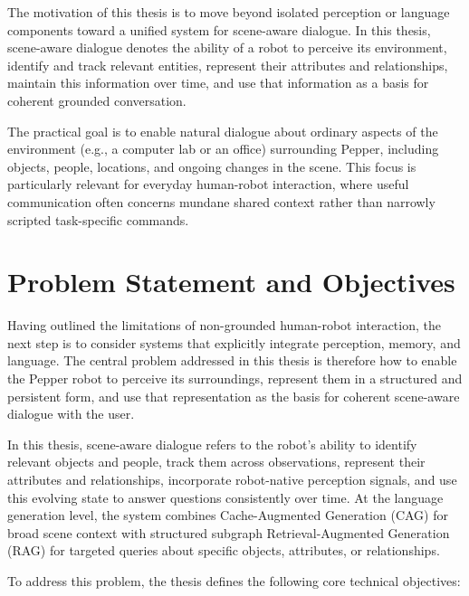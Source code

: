 The motivation of this thesis is to move beyond isolated perception or language components toward a unified system for scene-aware dialogue. In this thesis, scene-aware dialogue denotes the ability of a robot to perceive its environment, identify and track relevant entities, represent their attributes and relationships, maintain this information over time, and use that information as a basis for coherent grounded conversation.

The practical goal is to enable natural dialogue about ordinary aspects of the environment (e.g., a computer lab or an office) surrounding Pepper, including objects, people, locations, and ongoing changes in the scene. This focus is particularly relevant for everyday human-robot interaction, where useful communication often concerns mundane shared context rather than narrowly scripted task-specific commands.

\section{Problem Statement and Objectives}
Having outlined the limitations of non-grounded human-robot interaction, the next step is to consider systems that explicitly integrate perception, memory, and language. The central problem addressed in this thesis is therefore how to enable the Pepper robot to perceive its surroundings, represent them in a structured and persistent form, and use that representation as the basis for coherent scene-aware dialogue with the user.

In this thesis, scene-aware dialogue refers to the robot's ability to identify relevant objects and people, track them across observations, represent their attributes and relationships, incorporate robot-native perception signals, and use this evolving state to answer questions consistently over time. At the language generation level, the system combines Cache-Augmented Generation (CAG) for broad scene context with structured subgraph Retrieval-Augmented Generation (RAG) for targeted queries about specific objects, attributes, or relationships.

To address this problem, the thesis defines the following core technical objectives:

